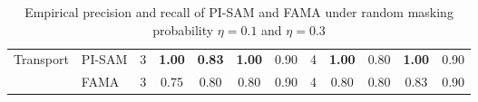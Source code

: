 \documentclass[letterpaper]{article} %
\begin{document}
\begin{table*}[t]
{\begin{tabular}{|l|l|c|c|c|c|c|c|c|c|c|c|}
\multirow{2}{*}{Transport} & PI-SAM                     & 3               & \textbf{1.00}           & \textbf{0.83}          &\textbf{1.00}           & 0.90          & 4               &  \textbf{1.00}          & 0.80          &  \textbf{1.00}          & 0.90           \\ 
                        & FAMA                       & 3               &  0.75          &0.80           & 0.80          &0.90           & 4               & 0.80           & 0.80          &  0.83          &  0.90          \\ 
\hline
\end{tabular}
}
\caption{Empirical precision and recall of PI-SAM and FAMA under random masking probability $\eta = 0.1$ and $\eta = 0.3$}
\label{tab:prec-rec}
    
\end{table*}


\begin{table}[t]
    \centering
    \caption{\# of transitions needed to learn the preconditions}
    \label{tab:pisam_sam}
\end{table}
\end{document}
